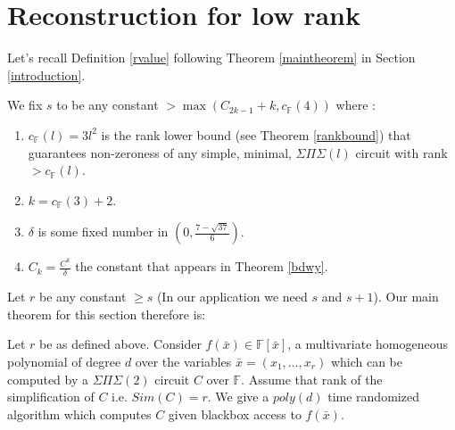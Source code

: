 \documentclass[letterpaper,USenglish,numberwithinsect]{lipics}
\newcommand{\F}{\mathbb{F}}
\newcommand{\B}[1]{\bar{#1}}
\begin{document}
\newpage




























\section{Reconstruction for low rank }\label{lowdimrecon}
Let's recall Definition \ref{rvalue} following Theorem \ref{maintheorem} in Section \ref{introduction}.

\begin{definition}
\begin{mdframed}
We fix $s$ to be any constant $> \max (C_{2k-1}+k, c_\F(4) )$ where :
\begin{enumerate}
\item $c_{\F}(l)=3l^2$ is the rank lower bound (see Theorem \ref{rankbound}) that guarantees non-zeroness of any simple, minimal, $\Sigma\Pi\Sigma(l)$ circuit with rank $> c_\F (l)$.
\item $k = c_{\F}(3) +2$.
\item $\delta$ is some fixed number in $(0,\frac{7-\sqrt{37}}{6})$.
 \item $C_k = \frac{C^k}{\delta}$ the constant that appears in Theorem \ref{bdwy}.

\end{enumerate}
\end{mdframed}
\end{definition}

Let $r$ be any constant $\geq s$ (In our application we need $s$ and $s+1$). Our main theorem for this section therefore is:
\begin{theorem}
Let $r$ be as defined above. Consider $f(\B{x})\in
\F[\B{x}]$,
a multivariate homogeneous polynomial of degree $d$ over the variables
$\B{x}=(x_1,\ldots,x_r)$ which can be computed by a $\Sigma\Pi\Sigma(2)$
circuit $C$ over $\F$. Assume that rank of the simplification of $C$ i.e. $Sim(C)=r$. We give a $poly(d)$
time randomized algorithm which computes $C$ given blackbox access to $f(\B{x})$.
\end{theorem}
\par{}\label{randomtransformation}
\end{document}
